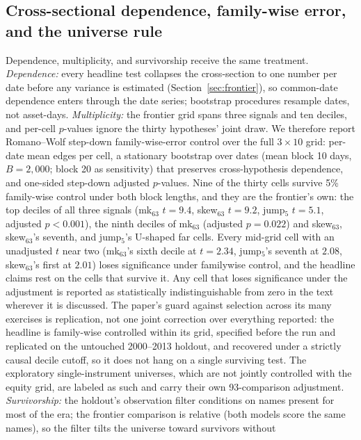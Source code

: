 \documentclass[11pt]{article}
\theoremstyle{remark}
\begin{document}
\subsection{Cross-sectional dependence, family-wise error, and the
universe rule}
\label{sec:fwer}

Dependence, multiplicity, and survivorship receive the same
treatment. \emph{Dependence:} every headline test collapses the cross-section
to one number per date before any variance is estimated
(Section~\ref{sec:frontier}), so common-date dependence enters
through the date series; bootstrap procedures resample dates, not
asset-days. \emph{Multiplicity:} the frontier grid spans three
signals and ten deciles, and per-cell $p$-values ignore the thirty
hypotheses' joint draw. We therefore report Romano--Wolf step-down
family-wise-error control over the full $3\times10$ grid: per-date
mean edges per cell, a stationary bootstrap over dates (mean block 10
days, $B=2{,}000$; block 20 as sensitivity) that preserves
cross-hypothesis dependence, and one-sided step-down adjusted
$p$-values.
Nine of the thirty cells survive 5\% family-wise control under both
block lengths, and they are the frontier's own: the top deciles of
all three signals (mk$_{63}$ $t=9.4$, skew$_{63}$ $t=9.2$, jump$_5$
$t=5.1$, adjusted $p<0.001$), the ninth deciles of mk$_{63}$
(adjusted $p=0.022$) and skew$_{63}$, skew$_{63}$'s seventh, and
jump$_5$'s U-shaped far cells. Every mid-grid cell with an unadjusted
$t$ near two (mk$_{63}$'s sixth decile at $t=2.34$, jump$_5$'s
seventh at $2.08$, skew$_{63}$'s first at $2.01$) loses
significance under familywise control, and the headline claims rest on
the cells that survive it. Any cell that loses significance under the
adjustment is reported as statistically indistinguishable from zero in
the text
wherever it is discussed. The paper's guard against selection across
its many exercises is replication, not one joint correction over
everything reported: the headline is family-wise controlled within its
grid, specified before the run and replicated on the untouched 2000--2013
holdout, and recovered under a strictly causal decile cutoff, so it
does not hang on a single surviving test. The exploratory
single-instrument universes, which are not jointly controlled with the
equity grid, are labeled as such and carry their own 93-comparison
adjustment. \emph{Survivorship:} the holdout's
observation filter conditions on names present for most of the era;
the frontier comparison is relative (both models score the same
names), so the filter tilts the universe toward survivors without
\end{document}
